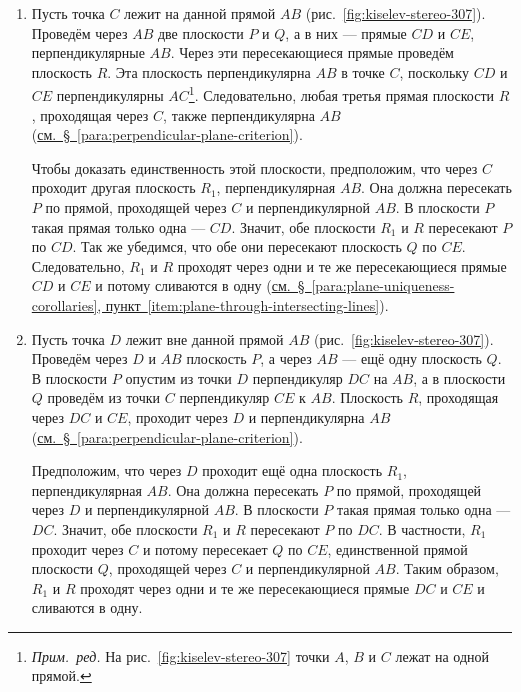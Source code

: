 \begin{enumerate}[label=\arabic*),ref=\arabic*]
    \item\label{item:normal-plane-point-on-line} Пусть точка \(C\) лежит на данной прямой \(AB\) (рис.~\ref{fig:kiselev-stereo-307}). Проведём через \(AB\) две плоскости \(P\) и \(Q\), а в них --- прямые \(CD\) и \(CE\), перпендикулярные \(AB\). Через эти пересекающиеся прямые проведём плоскость \(R\).
    Эта плоскость перпендикулярна \(AB\) в точке \(C\), поскольку \(CD\) и \(CE\) перпендикулярны \(AC\)\footnote{\emph{Прим.~ред.} На рис.~\ref{fig:kiselev-stereo-307} точки \(A\), \(B\) и \(C\) лежат на одной прямой.}. Следовательно, любая третья прямая плоскости \(R\), проходящая через \(C\), также перпендикулярна \(AB\) (\hyperref[para:perpendicular-plane-criterion]{см.~§~\ref*{para:perpendicular-plane-criterion}}).

    Чтобы доказать единственность этой плоскости, предположим, что через \(C\) проходит другая плоскость \(R_1\), перпендикулярная \(AB\). Она должна пересекать \(P\) по прямой, проходящей через \(C\) и перпендикулярной \(AB\). В плоскости \(P\) такая прямая только одна --- \(CD\). Значит, обе плоскости \(R_1\) и \(R\) пересекают \(P\) по \(CD\). Так же убедимся, что обе они пересекают плоскость \(Q\) по \(CE\). Следовательно, \(R_1\) и \(R\) проходят через одни и те же пересекающиеся прямые \(CD\) и \(CE\) и потому сливаются в одну (\hyperref[item:plane-through-intersecting-lines]{см.~§~\ref*{para:plane-uniqueness-corollaries}, пункт~\ref*{item:plane-through-intersecting-lines}}).

    \item\label{item:normal-plane-point-outside-line} Пусть точка \(D\) лежит вне данной прямой \(AB\) (рис.~\ref{fig:kiselev-stereo-307}). Проведём через \(D\) и \(AB\) плоскость \(P\), а через \(AB\) --- ещё одну плоскость \(Q\). В плоскости \(P\) опустим из точки \(D\) перпендикуляр \(DC\) на \(AB\), а в плоскости \(Q\) проведём из точки \(C\) перпендикуляр \(CE\) к \(AB\). Плоскость \(R\), проходящая через \(DC\) и \(CE\), проходит через \(D\) и перпендикулярна \(AB\) (\hyperref[para:perpendicular-plane-criterion]{см.~§~\ref*{para:perpendicular-plane-criterion}}).

    Предположим, что через \(D\) проходит ещё одна плоскость \(R_1\), перпендикулярная \(AB\). Она должна пересекать \(P\) по прямой, проходящей через \(D\) и перпендикулярной \(AB\). В плоскости \(P\) такая прямая только одна --- \(DC\).
    Значит, обе плоскости \(R_1\) и \(R\) пересекают \(P\) по \(DC\). В частности, \(R_1\) проходит через \(C\) и потому пересекает \(Q\) по \(CE\), единственной прямой плоскости \(Q\), проходящей через \(C\) и перпендикулярной \(AB\). Таким образом, \(R_1\) и \(R\) проходят через одни и те же пересекающиеся прямые \(DC\) и \(CE\) и сливаются в одну.
\end{enumerate}


